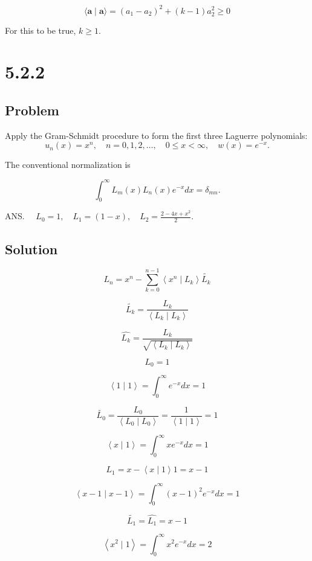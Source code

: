 \documentclass[12pt]{article}
\begin{document}
\[
    \langle\mathbf{a} \mid \mathbf{a}\rangle = {(a_1 - a_2)}^2 + (k - 1) a_2^2 \geq 0
\]

For this to be true, \(k \geq 1\).


\newpage
\section{5.2.2}

\subsection{Problem}

Apply the Gram-Schmidt procedure to form the first three Laguerre polynomials:
\[
    u_n(x)=x^n, \quad n=0,1,2, \ldots, \quad 0 \leq x<\infty, \quad w(x)=e^{-x} .
\]

The conventional normalization is

\[
    \int_0^{\infty} L_m(x) L_n(x) e^{-x} d x=\delta_{m n} .
\]

ANS. \(\quad L_0=1, \quad L_1=(1-x), \quad L_2=\frac{2-4 x+x^2}{2}\).

\subsection{Solution}

\[
    L_n = x^n - \sum_{k=0}^{n-1} \left\langle x^n \mid L_k\right\rangle \tilde{L_k}
\]

\[
    \tilde{L_k} = \frac{L_k}{\left\langle L_k \mid L_k\right\rangle}
\]

\[
    \hat{L_k} = \frac{L_k}{\sqrt{\left\langle L_k \mid L_k\right\rangle}}
\]

\[
    L_0 = 1
\]

\[
    \left\langle 1 \mid 1\right\rangle = \int_0^{\infty} e^{-x} d x = 1
\]

\[
    \tilde{L_0} = \frac{L_0}{\left\langle L_0 \mid L_0\right\rangle}  = \frac{1}{\left\langle 1 \mid 1\right\rangle} = 1
\]

\[
    \left\langle x \mid 1\right\rangle = \int_0^{\infty} x e^{-x} d x = 1
\]

\[
    L_1 = x - \left\langle x \mid 1\right\rangle 1 = x - 1
\]

\[
    \left\langle x - 1 \mid x - 1\right\rangle = \int_0^{\infty} {(x - 1)}^2 e^{-x} d x = 1
\]

\[
    \tilde{L_1} = \hat{L_1} = x - 1
\]

\[
    \left\langle x^2 \mid 1\right\rangle = \int_0^{\infty} x^2 e^{-x} d x = 2
\]
\end{document}
